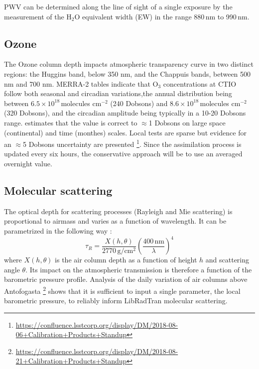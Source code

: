 \documentclass[onecolumn]{aa}
\begin{document}
PWV can be determined along the line of sight of a single exposure by the measurement of the H$_2$O equivalent width (EW) in the range 880\,nm to 990\,nm.  


\subsection{Ozone}


The Ozone column depth impacts atmospheric transparency curve in two distinct regions: the Huggins band, below 350 nm, and the Chappuis bands, between 500 nm and 700 nm.
MERRA-2 tables indicate that O$_3$ concentrations at CTIO follow both seasonal and circadian variations,the annual distribution being between $6.5  \times  10^{18}$\,molecules cm$^{-2}$ (240 Dobsons) and $8.6  \times  10^{18}$\,molecules cm$^{-2}$ (320 Dobsons), and the circadian amplitude being typically in a 10-20 Dobsons range. \cite{doi:10.1002/2013JD020914} estimates that the value is correct to $\approx$1 Dobsons on large space (continental) and time (monthes) scales. Local tests are sparse but evidence for an $\approx$5 Dobsons uncertainty are presented \footnote{\url{https://confluence.lsstcorp.org/display/DM/2018-08-06+Calibration+Products+Standup}}. Since the assimilation process is updated every six hours, the conservative approach will be to use an averaged overnight value. 


\subsection{Molecular scattering}


The optical depth for scattering processes (Rayleigh and Mie scattering) is proportional to airmass and varies as a function of wavelength. It can be parametrized in the following way :
\begin{equation}
\tau_R = \frac{X(h, \theta)}{ 2770\,\mathrm{g}/\mathrm{cm}^2} \left( \frac{400\,\mathrm{nm}}{\lambda} \right)^4
\end{equation}
where $X(h, \theta)$ is the air column depth as a function of height $h$ and scattering angle $\theta$.
Its impact on the atmospheric transmission is therefore a function of the barometric pressure profile. Analysis of the daily variation of air columns above Antofogasta \footnote{\url{https://confluence.lsstcorp.org/display/DM/2018-08-21+Calibration+Products+Standup}} shows that it is sufficient to input a single parameter, the local barometric pressure, to reliably inform LibRadTran molecular scattering. 
\end{document}
